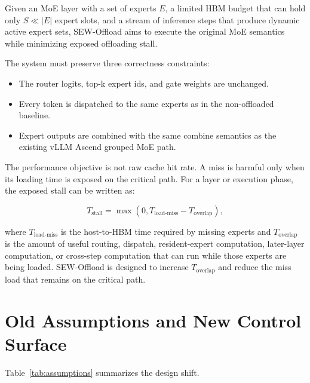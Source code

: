 \documentclass[10pt]{article}
\begin{document}
Given an MoE layer with a set of experts $E$, a limited HBM budget that can hold
only $S \ll |E|$ expert slots, and a stream of inference steps that produce
dynamic active expert sets, SEW-Offload aims to execute the original MoE
semantics while minimizing exposed offloading stall.

The system must preserve three correctness constraints:

\begin{itemize}[leftmargin=*]
  \item The router logits, top-k expert ids, and gate weights are unchanged.
  \item Every token is dispatched to the same experts as in the non-offloaded
  baseline.
  \item Expert outputs are combined with the same combine semantics as the
  existing vLLM Ascend grouped MoE path.
\end{itemize}

The performance objective is not raw cache hit rate. A miss is harmful only
when its loading time is exposed on the critical path. For a layer or execution
phase, the exposed stall can be written as:

\begin{equation}
T_{\text{stall}} =
\max(0, T_{\text{load-miss}} - T_{\text{overlap}}),
\end{equation}

where $T_{\text{load-miss}}$ is the host-to-HBM time required by missing
experts and $T_{\text{overlap}}$ is the amount of useful routing, dispatch,
resident-expert computation, later-layer computation, or cross-step computation
that can run while those experts are being loaded. SEW-Offload is designed to
increase $T_{\text{overlap}}$ and reduce the miss load that remains on the
critical path.

\section{Old Assumptions and New Control Surface}

Table~\ref{tab:assumptions} summarizes the design shift.
\end{document}
